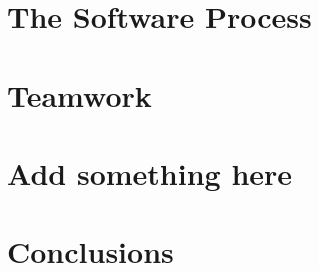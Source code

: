 \documentclass{l3proj}
\begin{document}


\newpage

\section{The Software Process}



\newpage

\section{Teamwork}



\newpage

\section{Add something here}

\newpage

\section{Conclusions}





\end{document}
